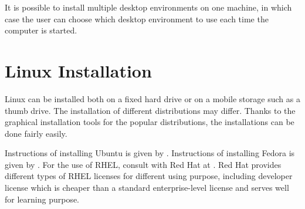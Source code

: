 It is possible to install multiple desktop environments on one machine, in which case the user can choose which desktop environment to use each time the computer is started.

\section{Linux Installation}

Linux can be installed both on a fixed hard drive or on a mobile storage such as a thumb drive. The installation of different distributions may differ. Thanks to the graphical installation tools for the popular distributions, the installations can be done fairly easily.

Instructions of installing Ubuntu is given by \cite{ubuntu2025ubuntu}. Instructions of installing Fedora is given by \cite{fedora2025fedora}. For the use of RHEL, consult with Red Hat at \cite{rhel2025rhel}. Red Hat provides different types of RHEL licenses for different using purpose, including developer license which is cheaper than a standard enterprise-level license and serves well for learning purpose.
